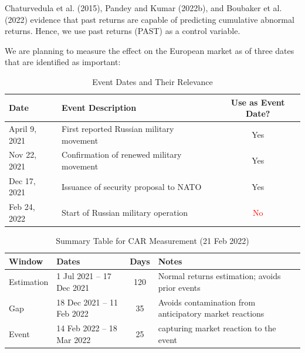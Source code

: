 \documentclass[12pt,a4paper]{article}
\begin{document}
Chaturvedula et al. (2015), Pandey and Kumar (2022b), and Boubaker et al. (2022) evidence that past returns are capable of predicting cumulative abnormal returns. Hence, we use past returns (PAST) as a control variable. \citep[p.~3]{kumari_are_2023}

We are planning to measure the effect on the European market as of three dates that are identified as important:


\begin{table}[h!]
\centering
\begin{tabular}{@{}llc@{}}
\toprule
\textbf{Date} & \textbf{Event Description} & \textbf{Use as Event Date?} \\
\midrule
April 9, 2021   & First reported Russian military movement       & Yes \\
Nov 22, 2021    & Confirmation of renewed military movement      & Yes \\
Dec 17, 2021    & Issuance of security proposal to NATO          & Yes \\
Feb 24, 2022    & Start of Russian military operation            & \textcolor{red}{No} \\
\bottomrule
\end{tabular}
\caption{Event Dates and Their Relevance}
\label{tab:event_dates}
\end{table}

\begin{table}[h!]
\centering
\begin{tabular}{@{}llcl@{}}
\toprule
\textbf{Window} & \textbf{Dates} & \textbf{Days}& \textbf{Notes} \\
\midrule
Estimation      & 1 Jul 2021 – 17 Dec 2021       & 120  & Normal returns estimation; avoids prior events \\
Gap             & 18 Dec 2021 – 11 Feb 2022      & 35   & Avoids contamination from anticipatory market reactions\\
Event           & 14 Feb 2022 – 18 Mar 2022      & 25   & capturing market reaction to the event\\
\bottomrule
\end{tabular}
\caption{Summary Table for CAR Measurement (21 Feb 2022)}
\label{tab:event_dates}
\end{table}
\end{document}
